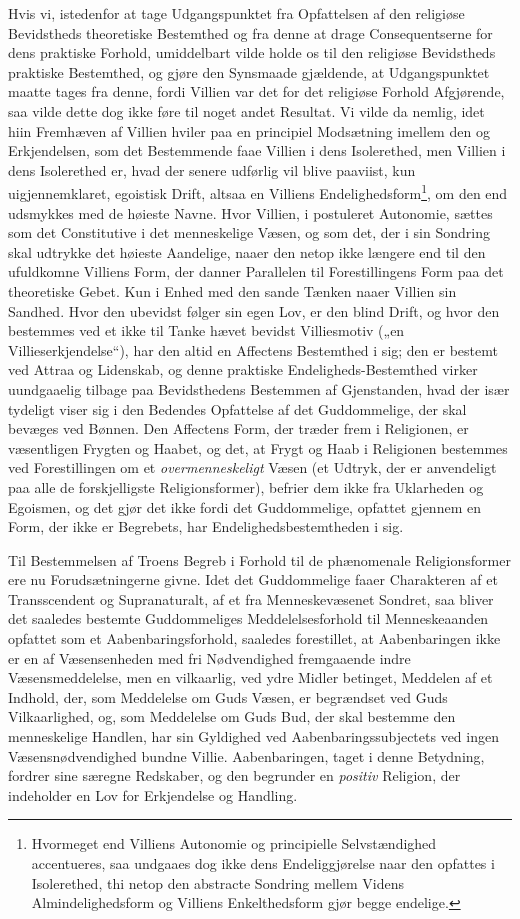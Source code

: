 \documentclass[12pt,a4paper]{book}
\newcommand{\opage}[1]{\marginnote{\footnotesize\textit{[#1]}}}
\begin{document}
Hvis vi, istedenfor at tage Udgangspunktet fra Opfattelsen af den religiøse
Bevidstheds theoretiske Bestemthed og fra denne at drage Consequentserne for
dens praktiske Forhold, umiddelbart vilde holde os til den religiøse Bevidstheds
praktiske Bestemthed, og gjøre den Synsmaade gjældende, at Udgangspunktet maatte
tages fra denne, fordi Villien var det for det religiøse Forhold Afgjørende, saa
vilde dette dog ikke føre til noget andet Resultat. Vi vilde da nemlig, idet hiin
Fremhæven af Villien hviler paa en principiel Modsætning imellem den og
Erkjendelsen, som det Bestemmende faae Villien i dens Isolerethed, men Villien i
dens Isolerethed er, hvad der senere udførlig vil blive paaviist, kun
uigjennemklaret, egoistisk Drift, altsaa en Vil\opage{38}liens
Endelighedsform\footnote{Hvormeget end Villiens Autonomie og principielle
Selvstændighed accentueres, saa undgaaes dog ikke dens Endeliggjørelse naar den
opfattes i Isolerethed, thi netop den abstracte Sondring mellem Videns
Almindelighedsform og Villiens Enkelthedsform gjør begge endelige.}, om den end
udsmykkes med de høieste Navne. Hvor Villien, i postuleret Autonomie, sættes som
det Constitutive i det menneskelige Væsen, og som det, der i sin Sondring skal
udtrykke det høieste Aandelige, naaer den netop ikke længere end til den
ufuldkomne Villiens Form, der danner Parallelen til Forestillingens Form paa det
theoretiske Gebet. Kun i Enhed med den sande Tænken naaer Villien sin Sandhed.
Hvor den ubevidst følger sin egen Lov, er den blind Drift, og hvor den bestemmes
ved et ikke til Tanke hævet bevidst Villiesmotiv („en Villieserkjendelse“), har
den altid en Affectens Bestemthed i sig; den er bestemt ved Attraa og Lidenskab,
og denne praktiske Endeligheds-Bestemthed virker uundgaaelig tilbage paa
Bevidsthedens Bestemmen af Gjenstanden, hvad der især tydeligt viser sig i den
Bedendes Opfattelse af det Guddommelige, der skal bevæges ved Bønnen. Den
Affectens Form, der træder frem i Religionen, er væsentligen Frygten og Haabet,
og det, at Frygt og Haab i Religionen bestemmes ved Forestillingen om et
\emph{overmenneskeligt} Væsen (et Udtryk, der er anvendeligt paa alle de
forskjelligste Religionsformer), befrier dem ikke fra Uklarheden og Egoismen, og
det gjør det ikke fordi det Guddommelige, opfattet gjennem en Form, der ikke er
Begrebets, har Endelighedsbestemtheden i sig.

Til Bestemmelsen af Troens Begreb i Forhold til de phænomenale Religionsformer
ere nu Forudsætningerne givne. Idet det Guddommelige faaer Charakteren af et
Transscendent og Supranaturalt, af et fra Menneskevæsenet Sondret, saa bliver det
saaledes bestemte Guddommeliges Meddelelsesforhold til Menneskeaanden opfattet
som et Aabenbaringsforhold, saaledes forestillet, at Aabenbaringen \opage{39}ikke er en af
Væsensenheden med fri Nødvendighed fremgaaende indre Væsensmeddelelse, men en
vilkaarlig, ved ydre Midler betinget, Meddelen af et Indhold, der, som Meddelelse
om Guds Væsen, er begrændset ved Guds Vilkaarlighed, og, som Meddelelse om Guds
Bud, der skal bestemme den menneskelige Handlen, har sin Gyldighed ved
Aabenbaringssubjectets ved ingen Væsensnødvendighed bundne Villie. Aabenbaringen,
taget i denne Betydning, fordrer sine særegne Redskaber, og den begrunder en
\emph{positiv} Religion, der indeholder en Lov for Erkjendelse og Handling.
\end{document}
